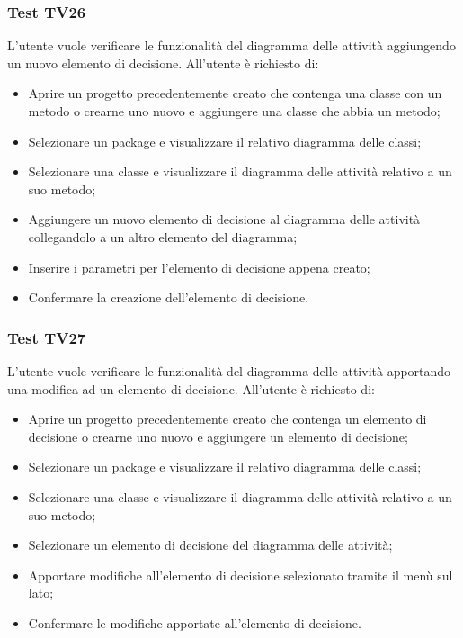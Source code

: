 \documentclass[../PianoDiQualifica.tex]{subfiles}
\begin{document}
	\subsubsection{Test TV26} 
	L'utente vuole verificare le funzionalità del diagramma delle attività aggiungendo un nuovo elemento di decisione. 
	All'utente è richiesto di: 
	\begin{itemize} 
		\item Aprire un progetto precedentemente creato che contenga una classe con un metodo o crearne uno nuovo e aggiungere una classe che abbia un metodo;
		\item Selezionare un package e visualizzare il relativo diagramma delle classi; 
		\item Selezionare una classe e visualizzare il diagramma delle attività relativo a un suo metodo; %
		\item Aggiungere un nuovo elemento di decisione al diagramma delle attività collegandolo a un altro elemento del diagramma; 
		\item Inserire i parametri per l'elemento di decisione appena creato; %
		\item Confermare la creazione dell'elemento di decisione. 
	\end{itemize} 
	
	\subsubsection{Test TV27} 
	L'utente vuole verificare le funzionalità del diagramma delle attività apportando una modifica ad un elemento di decisione. 
	All'utente è richiesto di: 
	\begin{itemize}  
		\item Aprire un progetto precedentemente creato che contenga un elemento di decisione o crearne uno nuovo e aggiungere un elemento di decisione;
		\item Selezionare un package e visualizzare il relativo diagramma delle classi; 
		\item Selezionare una classe e visualizzare il diagramma delle attività relativo a un suo metodo; 
		\item Selezionare un elemento di decisione del diagramma delle attività; 
		\item Apportare modifiche all'elemento di decisione selezionato tramite il menù sul lato; %
		\item Confermare le modifiche apportate all'elemento di decisione. 
	\end{itemize} 
	
\end{document}
